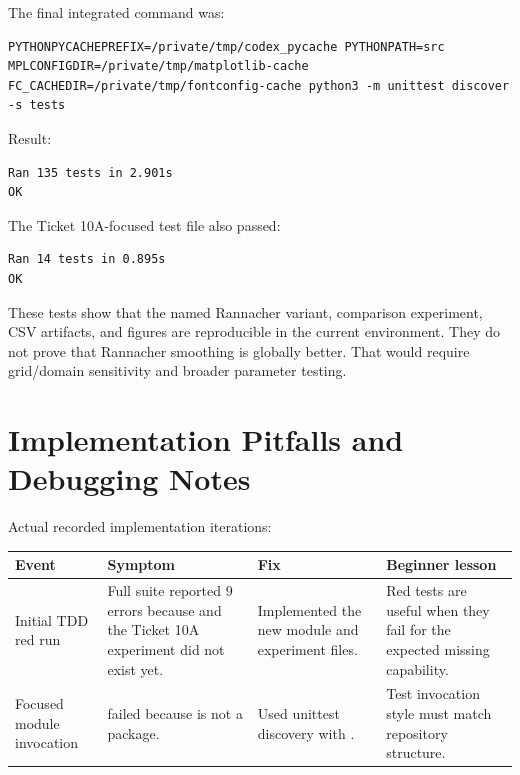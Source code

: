 \documentclass[11pt,a4paper]{article}
\begin{document}
The final integrated command was:
\begin{lstlisting}
PYTHONPYCACHEPREFIX=/private/tmp/codex_pycache PYTHONPATH=src MPLCONFIGDIR=/private/tmp/matplotlib-cache FC_CACHEDIR=/private/tmp/fontconfig-cache python3 -m unittest discover -s tests
\end{lstlisting}

Result:
\begin{lstlisting}
Ran 135 tests in 2.901s
OK
\end{lstlisting}

The Ticket 10A-focused test file also passed:
\begin{lstlisting}
Ran 14 tests in 0.895s
OK
\end{lstlisting}

These tests show that the named Rannacher variant, comparison experiment, CSV artifacts, and
figures are reproducible in the current environment. They do not prove that Rannacher smoothing
is globally better. That would require grid/domain sensitivity and broader parameter testing.

\section{Implementation Pitfalls and Debugging Notes}

Actual recorded implementation iterations:
\begin{longtable}{P{0.24\textwidth}L{0.24\textwidth}L{0.24\textwidth}L{0.17\textwidth}}
\toprule
Event & Symptom & Fix & Beginner lesson \\
\midrule
\endhead
Initial TDD red run & Full suite reported 9 errors because  and the Ticket 10A experiment did not exist yet. & Implemented the new module and experiment files. & Red tests are useful when they fail for the expected missing capability. \\
Focused module invocation &  failed because  is not a package. & Used unittest discovery with . & Test invocation style must match repository structure. \\
\bottomrule
\end{longtable}
\end{document}

